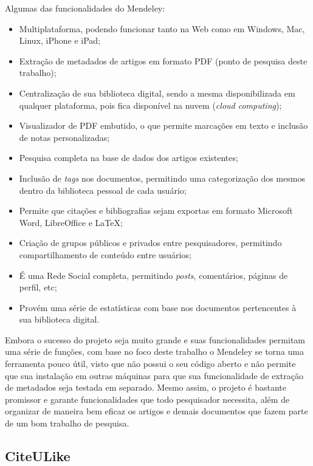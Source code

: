 Algumas das funcionalidades do Mendeley:

\begin{itemize}
    \item Multiplataforma, podendo funcionar tanto na Web como em Windows, Mac, Linux, iPhone e iPad;
    \item Extração de metadados de artigos em formato PDF (ponto de pesquisa deste trabalho);
    \item Centralização de sua biblioteca digital, sendo a mesma disponibilizada em qualquer plataforma, pois fica disponível na nuvem (\emph{cloud computing});
    \item Visualizador de PDF embutido, o que permite marcações em texto e inclusão de notas personalizadas;
    \item Pesquisa completa na base de dados dos artigos existentes;
    \item Inclusão de \emph{tags} nos documentos, permitindo uma categorização dos mesmos dentro da biblioteca pessoal de cada usuário;
    \item Permite que citações e bibliografias sejam exportas em formato Microsoft Word, LibreOffice e LaTeX;
    \item Criação de grupos públicos e privados entre pesquisadores, permitindo compartilhamento de conteúdo entre usuários;
    \item É uma Rede Social completa, permitindo \emph{posts}, comentários, páginas de perfil, etc;
    \item Provém uma série de estatísticas com base nos documentos pertencentes à sua biblioteca digital.
\end{itemize}


Embora o sucesso do projeto seja muito grande e suas funcionalidades permitam uma série de funções, com base no foco deste trabalho o Mendeley se torna uma ferramenta pouco útil, visto que não possui o seu código aberto e não permite que sua instalação em outras máquinas para que sua funcionalidade de extração de metadados seja testada em separado. Mesmo assim, o projeto é bastante promissor e garante funcionalidades que todo pesquisador necessita, além de organizar de maneira bem eficaz os artigos e demais documentos que fazem parte de um bom trabalho de pesquisa.

\subsection{CiteULike}
\label{ssec:citeulike}

